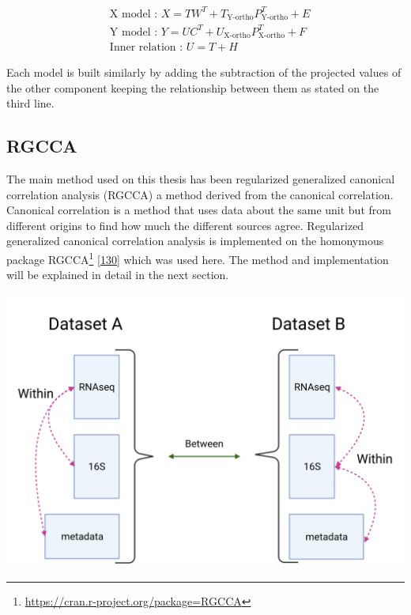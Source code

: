 \documentclass[
  a4paper,
]{book}
\DeclareRobustCommand{\href}[2]{#2\footnote{\url{#1}}}
\let\origfigure\figure
\let\endorigfigure\endfigure
\renewenvironment{figure}[1][2] {
    \expandafter\origfigure\expandafter[!ht]
} {
    \endorigfigure
}
\begin{document}
\[
\begin{aligned}
& \text{X model : } X = TW ^ T + T_{\text{Y-ortho}} P ^ T_{\text{Y-ortho}} + E \\
& \text{Y model : } Y = UC ^ T + U_{\text{X-ortho}} P ^ T_{\text{X-ortho}} + F \\
& \text{Inner relation : } U = T + H
\end{aligned}
\]

Each model is built similarly by adding the subtraction of the projected values of the other component keeping the relationship between them as stated on the third line.

\hypertarget{rgcca}{%
\subsection{RGCCA}\label{rgcca}}

The main method used on this thesis has been regularized generalized canonical correlation analysis (RGCCA) a method derived from the canonical correlation.
Canonical correlation is a method that uses data about the same unit but from different origins to find how much the different sources agree.
Regularized generalized canonical correlation analysis is implemented on the homonymous package \href{https://cran.r-project.org/package=RGCCA}{RGCCA} {[}\protect\hyperlink{ref-tenenhaus2017}{130}{]} which was used here.
The method and implementation will be explained in detail in the next section.

\begin{figure}
\includegraphics[width=1\linewidth]{images/multiomic_datasets} \caption[Multiomic relationships.]{Multiomic relationships on different datasets. Integration methods focus on relationships within datasets. Common relationships between datasets are used as confirmation/validation. Created with BioRender.com}\label{fig:multiomic-datasets}
\end{figure}
\end{document}
